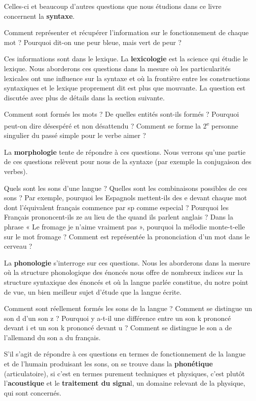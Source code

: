 {    Celles-ci et beaucoup d’autres questions que nous étudions dans ce livre concernent la \textbf{syntaxe}.

    Comment représenter et récupérer l’information sur le fonctionnement de chaque mot ? Pourquoi dit-on une peur bleue, mais vert de peur ?

    Ces informations sont dans le lexique. La \textbf{lexicologie} est la science qui étudie le lexique. Nous aborderons ces questions dans la mesure où les particularités lexicales ont une influence sur la syntaxe et où la frontière entre les constructions syntaxiques et le lexique proprement dit est plus que mouvante. La question est discutée avec plus de détails dans la section suivante.

    Comment sont formés les mots ? De quelles entités sont-ils formés ? Pourquoi peut-on dire désespéré et non désattendu ? Comment se forme la 2\textsuperscript{e} personne singulier du passé simple pour le verbe aimer ?

    La \textbf{morphologie} tente de répondre à ces questions. Nous verrons qu’une partie de ces questions relèvent pour nous de la syntaxe (par exemple la conjugaison des verbes).

    Quels sont les sons d’une langue ? Quelles sont les combinaisons possibles de ces sons ? Par exemple, pourquoi les Espagnols mettent-ils des e devant chaque mot dont l’équivalent français commence par sp comme especial ? Pourquoi les Français prononcent-ils ze au lieu de the quand ils parlent anglais ? Dans la phrase « Le fromage je n’aime vraiment pas », pourquoi la mélodie monte-t-elle sur le mot fromage ? Comment est représentée la prononciation d’un mot dans le cerveau ?

    La \textbf{phonologie} s’interroge sur ces questions. Nous les aborderons dans la mesure où la structure phonologique des énoncés nous offre de nombreux indices sur la structure syntaxique des énoncés et où la langue parlée constitue, du notre point de vue, un bien meilleur sujet d’étude que la langue écrite.

    Comment sont réellement formés les sons de la langue ? Comment se distingue un son d d’un son z ? Pourquoi y a-t-il une différence entre un son k prononcé devant i et un son k prononcé devant u ? Comment se distingue le son a de l’allemand du son a du français.

    S’il s’agit de répondre à ces questions en termes de fonctionnement de la langue et de l’humain produisant les sons, on se trouve dans la \textbf{phonétique} (articulatoire), si c’est en termes purement techniques et physiques, c’est plutôt l’\textbf{acoustique} et le \textbf{traitement du signa}l, un domaine relevant de la physique, qui sont concernés.

}
